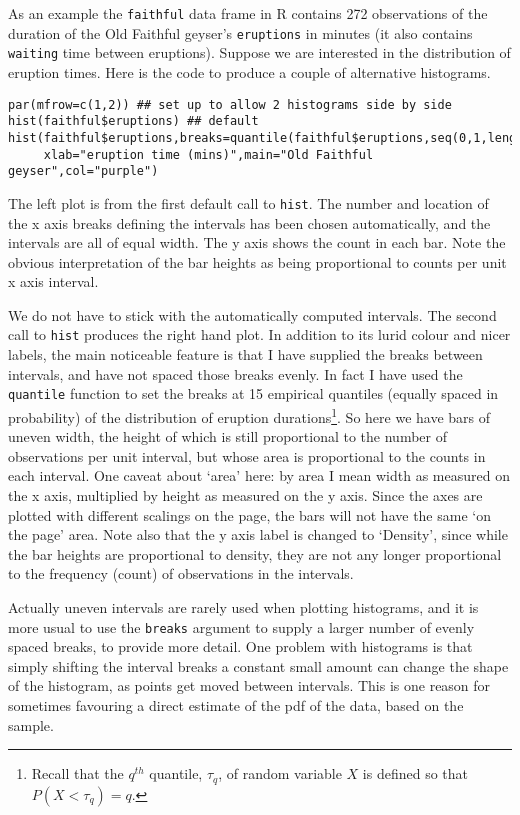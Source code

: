 \documentclass[10pt] {article}
\newcommand{\eps}[3]
{{\begin{center}
 \rotatebox{#1}{\scalebox{#2}{\texttt{[image: \#3]}}}
 \end{center}}
}
\theoremstyle{definition}
\begin{document}
As an example the {\tt faithful} data frame in R contains 272 observations of the duration of the Old Faithful geyser's {\tt eruptions} in minutes (it also contains {\tt waiting} time between eruptions). Suppose we are interested in the distribution of eruption times. Here is the code to produce a couple of alternative histograms.
\begin{lstlisting}
par(mfrow=c(1,2)) ## set up to allow 2 histograms side by side
hist(faithful$eruptions) ## default
hist(faithful$eruptions,breaks=quantile(faithful$eruptions,seq(0,1,length=15)),
     xlab="eruption time (mins)",main="Old Faithful geyser",col="purple")
\end{lstlisting}
\eps{-90}{.6}{geyser-base.eps}
The left plot is from the first default call to \lstinline+hist+. The number and location of the x axis breaks defining the intervals has been chosen automatically, and the intervals are all of equal width. The y axis shows the count in each bar. Note the obvious interpretation of the bar heights as being proportional to counts per unit x axis interval. 

We do not have to stick with the automatically computed intervals. The second call to \lstinline+hist+ produces the right hand plot. In addition to its lurid colour and nicer labels, the main noticeable feature is that I have supplied the breaks between intervals, and have not spaced those breaks evenly. In fact I have used the {\tt quantile} function to set the breaks at 15 empirical quantiles (equally spaced in probability) of the distribution of eruption durations\footnote{Recall that the $q^{th}$ quantile, $\tau_q$, of random variable $X$ is defined so that $P(X<\tau_q) = q$.}. So here we have bars of uneven width, the height of which is still proportional to the number of observations per unit interval, but whose area is proportional to the counts in each interval. One caveat about `area' here: by area I mean width as measured on the x axis, multiplied by height as measured on the y axis. Since the axes are plotted with different scalings on the page, the bars will not have the same `on the page' area. Note also that the y axis label is changed to `Density', since while the bar heights are proportional to density, they are not any longer proportional to the frequency (count) of observations in the intervals. 

Actually uneven intervals are rarely used when plotting histograms, and it is more usual to use the {\tt breaks} argument  to supply a larger number of evenly spaced breaks, to provide more detail. One problem with histograms is that simply shifting the interval breaks a constant small amount can change the shape of the histogram, as points get moved between intervals. This is one reason for sometimes favouring a direct estimate of the pdf of the data, based on the sample. 
\end{document}
